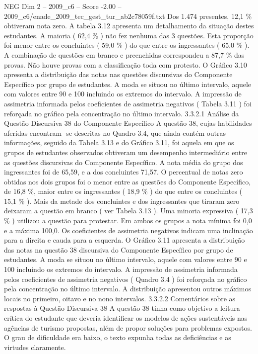 \begin{textsample}{NEG Dim 2 – 2009\_c6 – Score -2.00 – 2009\_c6/enade\_2009\_tec\_gest\_tur\_ab2c78059f.txt}
Dos 1.474 presentes, 12,1 \% obtiveram nota zero.
A tabela 3.12 apresenta um detalhamento da situação destes estudantes.
A maioria ( 62,4 \% ) não fez nenhuma das 3 questões.
Esta proporção foi menor entre os concluintes ( 59,0 \% ) do que entre os ingressantes ( 65,0 \% ).
A combinação de questões em branco e preenchidas correspondeu a 87,7 \% das provas.
Não houve provas com a classificação toda com protesto.
O Gráfico 3.10 apresenta a distribuição das notas nas questões discursivas do Componente Específico por grupo de estudantes.
A moda se situou no último intervalo, aquele com valores entre 90 e 100 incluindo os extremos do intervalo.
A impressão de assimetria informada pelos coeficientes de assimetria negativos ( Tabela 3.11 ) foi reforçada no gráfico pela concentração no último intervalo. 3.3.2.1 Análise da Questão Discursiva 38 do Componente Específico A questão 38, cujas habilidades aferidas encontram -se descritas no Quadro 3.4, que ainda contém outras informações, seguido da Tabela 3.13 e do Gráfico 3.11, foi aquela em que os grupos de estudantes observados obtiveram um desempenho intermediário entre as questões discursivas do Componente Específico.
A nota média do grupo dos ingressantes foi de 65,59, e a dos concluintes 71,57.
O percentual de notas zero obtidas nos dois grupos foi o menor entre as questões do Componente Específico, de 16,8 \%, maior entre os ingressantes ( 18,9 \% ) do que entre os concluintes ( 15,1 \% ).
Mais da metade dos concluintes e dos ingressantes que tiraram zero deixaram a questão em branco ( ver Tabela 3.13 ).
Uma minoria expressiva ( 17,3 \% ) utilizou a questão para protestar.
Em ambos os grupos a nota mínima foi 0,0 e a máxima 100,0.
Os coeficientes de assimetria negativos indicam uma inclinação para a direita e cauda para a esquerda.
O Gráfico 3.11 apresenta a distribuição das notas na questão 38 discursiva do Componente Específico por grupo de estudantes.
A moda se situou no último intervalo, aquele com valores entre 90 e 100 incluindo os extremos do intervalo.
A impressão de assimetria informada pelos coeficientes de assimetria negativos ( Quadro 3.4 ) foi reforçada no gráfico pela concentração no último intervalo.
A distribuição apresentou outros máximos locais no primeiro, oitavo e no nono intervalos. 3.3.2.2 Comentários sobre as respostas à Questão Discursiva 38 A questão 38 tinha como objetivo a leitura crítica do estudante que deveria identificar os modelos de ações sustentáveis nas agências de turismo propostas, além de propor soluções para problemas expostos.
O grau de dificuldade era baixo, o texto expunha todas as deficiências e as virtudes claramente.

\end{textsample}
